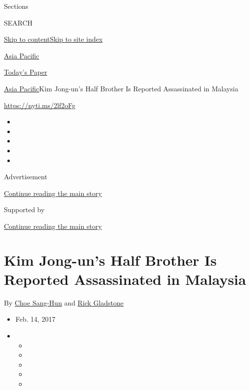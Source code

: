 Sections

SEARCH

\protect\hyperlink{site-content}{Skip to
content}\protect\hyperlink{site-index}{Skip to site index}

\href{https://www.nytimes.com/section/world/asia}{Asia Pacific}

\href{https://myaccount.nytimes.com/auth/login?response_type=cookie\&client_id=vi}{}

\href{https://www.nytimes.com/section/todayspaper}{Today's Paper}

\href{/section/world/asia}{Asia Pacific}\textbar{}Kim Jong-un's Half
Brother Is Reported Assassinated in Malaysia

\url{https://nyti.ms/2lf2oFg}

\begin{itemize}
\item
\item
\item
\item
\item
\end{itemize}

Advertisement

\protect\hyperlink{after-top}{Continue reading the main story}

Supported by

\protect\hyperlink{after-sponsor}{Continue reading the main story}

\hypertarget{kim-jong-uns-half-brother-is-reported-assassinated-in-malaysia}{%
\section{Kim Jong-un's Half Brother Is Reported Assassinated in
Malaysia}\label{kim-jong-uns-half-brother-is-reported-assassinated-in-malaysia}}

By \href{http://www.nytimes.com/by/choe-sang-hun}{Choe Sang-Hun} and
\href{https://www.nytimes.com/by/rick-gladstone}{Rick Gladstone}

\begin{itemize}
\item
  Feb. 14, 2017
\item
  \begin{itemize}
  \item
  \item
  \item
  \item
  \item
  \end{itemize}
\end{itemize}

